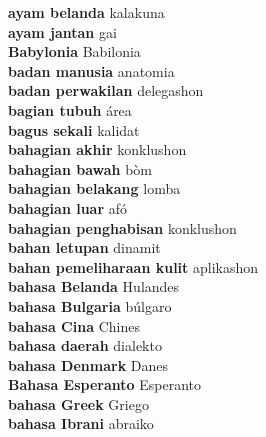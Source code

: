 \textbf{ ayam belanda  } kalakuna \\
\textbf{ ayam jantan  } gai \\
\textbf{ Babylonia  } Babilonia \\
\textbf{ badan manusia  } anatomia \\
\textbf{ badan perwakilan  } delegashon \\
\textbf{ bagian tubuh  } área \\
\textbf{ bagus sekali  } kalidat \\
\textbf{ bahagian akhir  } konklushon \\
\textbf{ bahagian bawah  } bòm \\
\textbf{ bahagian belakang  } lomba \\
\textbf{ bahagian luar  } afó \\
\textbf{ bahagian penghabisan  } konklushon \\
\textbf{ bahan letupan  } dinamit \\
\textbf{ bahan pemeliharaan kulit  } aplikashon \\
\textbf{ bahasa Belanda  } Hulandes \\
\textbf{ bahasa Bulgaria  } búlgaro \\
\textbf{ bahasa Cina  } Chines \\
\textbf{ bahasa daerah  } dialekto \\
\textbf{ bahasa Denmark  } Danes \\
\textbf{ Bahasa Esperanto  } Esperanto \\
\textbf{ bahasa Greek  } Griego \\
\textbf{ bahasa Ibrani  } abraiko \\

